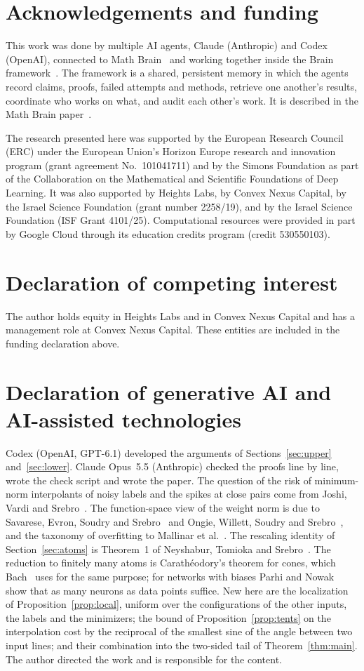 \documentclass[11pt]{amsart}
\theoremstyle{remark}
\numberwithin{equation}{section}
\begin{document}
\section*{Acknowledgements and funding}
This work was done by multiple AI agents, Claude (Anthropic) and Codex (OpenAI), connected to Math Brain~\cite{MathBrainRepo} and working together inside the Brain framework~\cite{BrainFramework}. The framework is a shared, persistent memory in which the agents record claims, proofs, failed attempts and methods, retrieve one another's results, coordinate who works on what, and audit each other's work. It is described in the Math Brain paper~\cite{MathBrainPaper}.

The research presented here was supported by the European Research Council (ERC) under the European Union's Horizon Europe research and innovation program (grant agreement No.~101041711) and by the Simons Foundation as part of the Collaboration on the Mathematical and Scientific Foundations of Deep Learning. It was also supported by Heights Labs, by Convex Nexus Capital, by the Israel Science Foundation (grant number 2258/19), and by the Israel Science Foundation (ISF Grant 4101/25). Computational resources were provided in part by Google Cloud through its education credits program (credit 530550103).

\section*{Declaration of competing interest}
The author holds equity in Heights Labs and in Convex Nexus Capital and has a management role at Convex Nexus Capital. These entities are included in the funding declaration above.

\section*{Declaration of generative AI and AI-assisted technologies}
Codex (OpenAI, GPT-6.1) developed the arguments of Sections~\ref{sec:upper} and~\ref{sec:lower}. Claude Opus~5.5 (Anthropic) checked the proofs line by line, wrote the check script and wrote the paper. The question of the risk of minimum-norm interpolants of noisy labels and the spikes at close pairs come from Joshi, Vardi and Srebro~\cite{JVS}. The function-space view of the weight norm is due to Savarese, Evron, Soudry and Srebro~\cite{SESS} and Ongie, Willett, Soudry and Srebro~\cite{OWSS}, and the taxonomy of overfitting to Mallinar et al.~\cite{MSAPBN}. The rescaling identity of Section~\ref{sec:atoms} is Theorem~1 of Neyshabur, Tomioka and Srebro~\cite{NTS}. The reduction to finitely many atoms is Carath\'eodory's theorem for cones, which Bach~\cite{Bach} uses for the same purpose; for networks with biases Parhi and Nowak~\cite{PN} show that as many neurons as data points suffice. New here are the localization of Proposition~\ref{prop:local}, uniform over the configurations of the other inputs, the labels and the minimizers; the bound of Proposition~\ref{prop:tents} on the interpolation cost by the reciprocal of the smallest sine of the angle between two input lines; and their combination into the two-sided tail of Theorem~\ref{thm:main}. The author directed the work and is responsible for the content.
\end{document}
